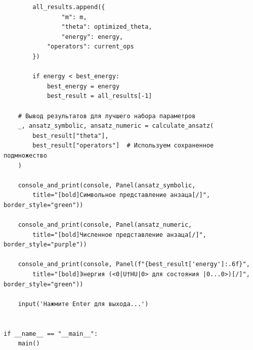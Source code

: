 \documentclass[a4paper]{report}
\begin{document}
\begin{lstlisting}
        all_results.append({
                "m": m,
                "theta": optimized_theta,
                "energy": energy,
            "operators": current_ops
        })

        if energy < best_energy:
            best_energy = energy
            best_result = all_results[-1]

    # Вывод результатов для лучшего набора параметров
    _, ansatz_symbolic, ansatz_numeric = calculate_ansatz(
        best_result["theta"],
        best_result["operators"]  # Используем сохраненное подмножество
    )

    console_and_print(console, Panel(ansatz_symbolic,
        title="[bold]Символьное представление анзаца[/]", border_style="green"))

    console_and_print(console, Panel(ansatz_numeric,
        title="[bold]Численное представление анзаца[/]", border_style="purple"))

    console_and_print(console, Panel(f"{best_result['energy']:.6f}",
        title="[bold]Энергия (<0|U†HU|0> для состояния |0...0>)[/]", border_style="green"))

    input('Нажмите Enter для выхода...')


if __name__ == "__main__":
    main()
\end{lstlisting}
\end{document}
